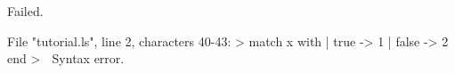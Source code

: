 \runverbatimfalse
{}
\begin{RunVerbatimMsg}
Failed.
\end{RunVerbatimMsg}
\begin{RunVerbatimErr}
File "tutorial.ls", line 2, characters 40-43:
>  match x with | true -> 1 | false -> 2 end
>                                        ^^^
Syntax error.
\end{RunVerbatimErr}
